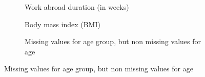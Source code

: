 \documentclass[runningheads]{llncs}
\begin{document}
\begin{figure}[ht]
    \caption{Know your data}
    \label{fig:know_your_data}
    \centering

    \begin{subfigure}{\textwidth}
        \centering        
        \caption{Work abroad duration (in weeks)}
        \label{subfig:graph_datasynthesizer_wkabdur}
    \end{subfigure}

    \begin{subfigure}{\textwidth}
        \centering        
        \caption{Body mass index (BMI)}
        \label{subfig:graph_datasynthesizer_bmi}
    \end{subfigure}

    \begin{subfigure}{\textwidth}
        \centering        
        \caption{Missing values for age group, but non missing values for age}
        \label{subfig:graph_datasynthesizer_agegr}
    \end{subfigure}


\end{figure}
\end{document}
